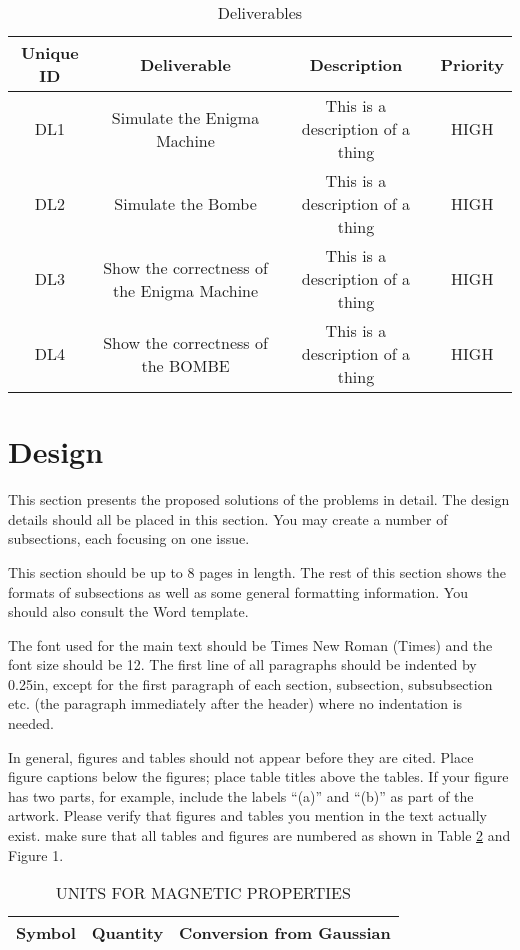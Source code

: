 \documentclass[12pt,a4paper]{article}
\begin{document}
\begin{table}[htb]
\centering
\caption{Deliverables}
\vspace*{6pt}
\label{units}
\begin{tabular}{cccc}\hline\hline
Unique ID & Deliverable & Description & Priority \\ \hline
DL1 & Simulate the Enigma Machine & This is a description of a thing & HIGH \\
DL2 & Simulate the Bombe & This is a description of a thing & HIGH \\
DL3 & Show the correctness of the Enigma Machine & This is a description of a thing & HIGH \\
DL4 & Show the correctness of the BOMBE & This is a description of a thing & HIGH \\
\end{tabular}
\end{table}

\section{Design}

This section presents the proposed solutions of the problems in detail. The design details should all be placed in this section. You may create a number of subsections, each focusing on one issue.

This section should be up to 8 pages in length.
The rest of this section shows the formats of subsections as well as some general formatting information.  You should also consult the Word template.

The font used for the main text should be Times New Roman (Times) and the font size should be 12.  The first line of all paragraphs should be indented by 0.25in, except for the first paragraph of each section, subsection, subsubsection etc. (the paragraph immediately after the header) where no indentation is needed.

In general, figures and tables should not appear before they are cited.  Place figure captions below the figures; place table titles above the tables.  If your figure has two parts, for example, include the labels ``(a)'' and ``(b)'' as part of the artwork.  Please verify that figures and tables you mention in the text actually exist.  make sure that all tables and figures are numbered as shown in Table \ref{units} and Figure 1.

\begin{table}[htb]
\centering
\caption{UNITS FOR MAGNETIC PROPERTIES}
\vspace*{6pt}
\label{units}
\begin{tabular}{ccc}\hline\hline
Symbol & Quantity & Conversion from Gaussian \\ \hline
\end{tabular}
\end{table}
\end{document}
